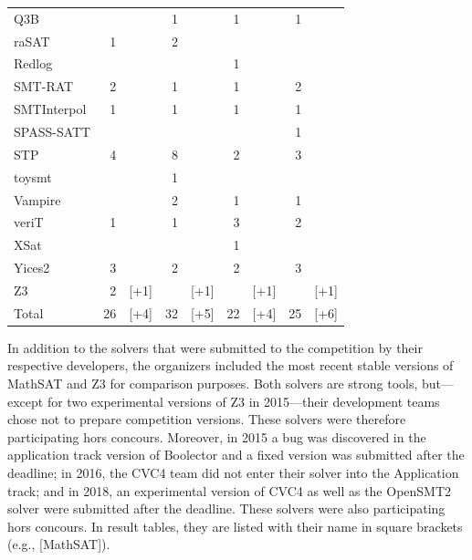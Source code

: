 \documentclass[dvipsnames,table,twoside,11pt]{article}
\begin{document}
\begin{table}
\begin{tabular}{lr@{\,\,}rr@{\,\,}rr@{\,\,}rr@{\,\,}r}
    Q3B               &    &      &  1 &      &  1 &      &  1 &      \\
    raSAT             &  1 &      &  2 &      &    &      &    &      \\
    Redlog            &    &      &    &      &  1 &      &    &      \\
    SMT-RAT           &  2 &      &  1 &      &  1 &      &  2 &      \\
    SMTInterpol       &  1 &      &  1 &      &  1 &      &  1 &      \\
    SPASS-SATT        &    &      &    &      &    &      &  1 &      \\
    STP               &  4 &      &  8 &      &  2 &      &  3 &      \\
    toysmt            &    &      &  1 &      &    &      &    &      \\
    Vampire           &    &      &  2 &      &  1 &      &  1 &      \\
    veriT             &  1 &      &  1 &      &  3 &      &  2 &      \\
    XSat              &    &      &    &      &  1 &      &    &      \\
    Yices2            &  3 &      &  2 &      &  2 &      &  3 &      \\
    Z3                &  2 & [+1] &    & [+1] &    & [+1] &    & [+1] \\
    \midrule
    Total             & 26 & [+4] & 32 & [+5] & 22 & [+4] & 25 & [+6] \\
    \bottomrule
  \end{tabular}
\end{table}

In addition to the solvers that were submitted to the competition by
their respective developers, the organizers included the most recent
stable versions of MathSAT and Z3 for comparison purposes.  Both
solvers are strong tools, but---except for two experimental versions
of Z3 in 2015---their development teams chose not to prepare
competition versions.  These solvers were therefore participating hors
concours.  Moreover, in 2015 a bug was discovered in the application
track version of Boolector and a fixed version was submitted after the
deadline; in 2016, the CVC4 team did not enter their solver into the
Application track; and in 2018, an experimental version of CVC4 as
well as the OpenSMT2 solver were submitted after the deadline.  These
solvers were also participating hors concours.  In result tables, they
are listed with their name in square brackets (e.g., [MathSAT]).
\end{document}
